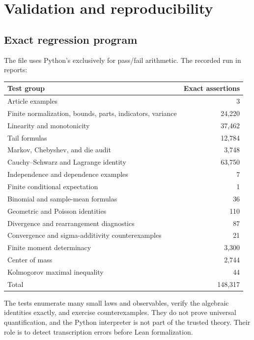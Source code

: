 \section{Validation and reproducibility}\label{app:validation}

\subsection{Exact regression program}

The file  uses Python's
 exclusively for pass/fail arithmetic.  The recorded
run in  reports:

\begin{center}
\begin{tabular}{@{}lr@{}}
\toprule
Test group & Exact assertions \\
\midrule
Article examples & 3 \\
Finite normalization, bounds, parts, indicators, variance & 24,220 \\
Linearity and monotonicity & 37,462 \\
Tail formulas & 12,784 \\
Markov, Chebyshev, and die audit & 3,748 \\
Cauchy--Schwarz and Lagrange identity & 63,750 \\
Independence and dependence examples & 7 \\
Finite conditional expectation & 1 \\
Binomial and sample-mean formulas & 36 \\
Geometric and Poisson identities & 110 \\
Divergence and rearrangement diagnostics & 87 \\
Convergence and sigma-additivity counterexamples & 21 \\
Finite moment determinacy & 3,300 \\
Center of mass & 2,744 \\
Kolmogorov maximal inequality & 44 \\
\midrule
Total & 148,317 \\
\bottomrule
\end{tabular}
\end{center}

The tests enumerate many small laws and observables, verify the algebraic
identities exactly, and exercise counterexamples.  They do not prove universal
quantification, and the Python interpreter is not part of the trusted theory.
Their role is to detect transcription errors before Lean formalization.

